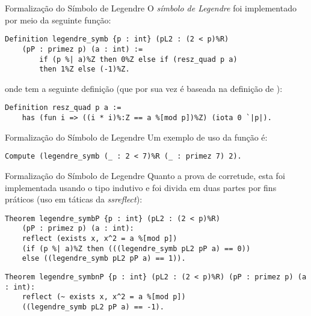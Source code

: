 \begin{frame}[fragile]{Formalização do Símbolo de Legendre}
    O \textit{símbolo de Legendre} foi implementado por meio da seguinte função:
        
        \begin{lstlisting}[language=coq,frame=single,tabsize=1]
Definition legendre_symb {p : int} (pL2 : (2 < p)%R) 
    (pP : primez p) (a : int) :=
        if (p %| a)%Z then 0%Z else if (resz_quad p a)
        then 1%Z else (-1)%Z.
        \end{lstlisting}
        
        onde  tem a seguinte definição (que por sua vez é baseada na definição de ):
        
        \begin{lstlisting}[language=coq,frame=single,tabsize=1]
Definition resz_quad p a := 
    has (fun i => ((i * i)%:Z == a %[mod p])%Z) (iota 0 `|p|).
        \end{lstlisting}
    
\end{frame}

\begin{frame}[fragile]{Formalização do Símbolo de Legendre}
    Um exemplo de uso da função  é:
            \begin{lstlisting}[language=coq,frame=single,tabsize=1]
Compute (legendre_symb (_ : 2 < 7)%R (_ : primez 7) 2).
            \end{lstlisting}

\end{frame}

\begin{frame}[fragile]{Formalização do Símbolo de Legendre}
    Quanto a prova de corretude, esta foi implementada usando o tipo indutivo  e foi divida em duas partes por fins práticos (uso em táticas da \textit{ssreflect}):
    \newline
        \begin{lstlisting}[language=coq,frame=single,tabsize=1, escapechar=@]
Theorem legendre_symbP {p : int} (pL2 : (2 < p)%R) 
    (pP : primez p) (a : int):
    reflect (exists x, x^2 = a %[mod p]) 
    (if (p %| a)%Z then (((legendre_symb pL2 pP a) == 0)) 
    else ((legendre_symb pL2 pP a) == 1)).
        \end{lstlisting}
            
        \begin{lstlisting}[language=coq,frame=single,tabsize=1, escapechar=@]
Theorem legendre_symbnP {p : int} (pL2 : (2 < p)%R) (pP : primez p) (a : int):
    reflect (~ exists x, x^2 = a %[mod p]) 
    ((legendre_symb pL2 pP a) == -1).
        \end{lstlisting}
\end{frame}

